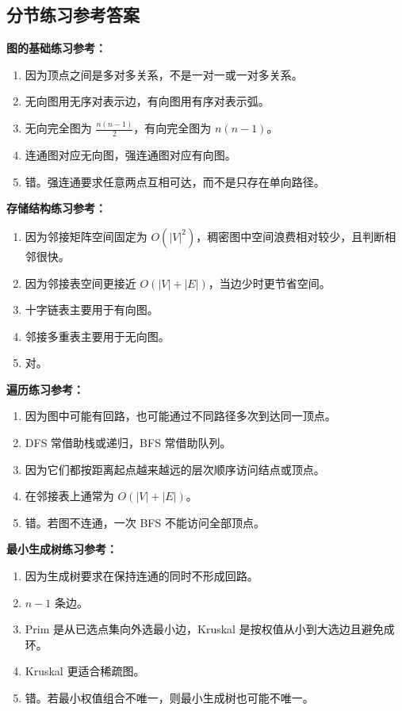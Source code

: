 \documentclass{../../note}
\begin{document}
\subsection{分节练习参考答案}

\textbf{图的基础练习参考：}

\begin{enumerate}
  \item 因为顶点之间是多对多关系，不是一对一或一对多关系。
  \item 无向图用无序对表示边，有向图用有序对表示弧。
  \item 无向完全图为 $\frac{n(n-1)}{2}$，有向完全图为 $n(n-1)$。
  \item 连通图对应无向图，强连通图对应有向图。
  \item 错。强连通要求任意两点互相可达，而不是只存在单向路径。
\end{enumerate}

\textbf{存储结构练习参考：}

\begin{enumerate}
  \item 因为邻接矩阵空间固定为 $O(|V|^2)$，稠密图中空间浪费相对较少，且判断相邻很快。
  \item 因为邻接表空间更接近 $O(|V| + |E|)$，当边少时更节省空间。
  \item 十字链表主要用于有向图。
  \item 邻接多重表主要用于无向图。
  \item 对。
\end{enumerate}

\textbf{遍历练习参考：}

\begin{enumerate}
  \item 因为图中可能有回路，也可能通过不同路径多次到达同一顶点。
  \item DFS 常借助栈或递归，BFS 常借助队列。
  \item 因为它们都按距离起点越来越远的层次顺序访问结点或顶点。
  \item 在邻接表上通常为 $O(|V| + |E|)$。
  \item 错。若图不连通，一次 BFS 不能访问全部顶点。
\end{enumerate}

\textbf{最小生成树练习参考：}

\begin{enumerate}
  \item 因为生成树要求在保持连通的同时不形成回路。
  \item $n-1$ 条边。
  \item Prim 是从已选点集向外选最小边，Kruskal 是按权值从小到大选边且避免成环。
  \item Kruskal 更适合稀疏图。
  \item 错。若最小权值组合不唯一，则最小生成树也可能不唯一。
\end{enumerate}
\end{document}
